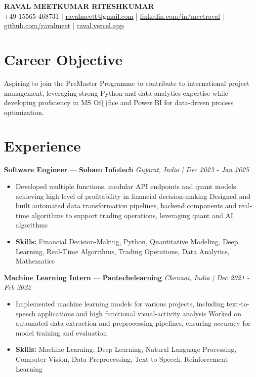 \documentclass[a4paper,10pt]{article}
\begin{document}
\begin{center}
  {\Large\bfseries RAVAL MEETKUMAR RITESHKUMAR}\\[2pt]
  {\small +49 15565 468731 \;|\; \href{mailto:ravalmeett@gmail.com}{ravalmeett@gmail.com} \;|\; \href{https://www.linkedin.com/in/meetraval/}{linkedin.com/in/meetraval} \;|\; \href{https://github.com/ravalmeet}{github.com/ravalmeet} \;|\; \href{https://raval.vercel.app/}{raval.vercel.app}}
\end{center}
\vspace{-3pt}

\section*{Career Objective}
Aspiring to join the PreMaster Programme to contribute to international project management, leveraging strong Python and data analytics expertise while developing proficiency in MS Of\{\}fice and Power BI for data-driven process optimization.\par

\section*{Experience}
\textbf{Software Engineer} — \textbf{Soham Infotech} \hfill \textit{Gujarat, India \;|\; Dec 2023 - Jan 2025}\par
\vspace{1pt}
\begin{itemize}
  \item Developed multiple functions, modular API endpoints and quant models achieving high level of profitability in financial decision-making Designed and built automated data transformation pipelines, backend components and real-time algorithms to support trading operations, leveraging quant and AI algorithms
  \item \textbf{Skills:} Financial Decision-Making, Python, Quantitative Modeling, Deep Learning, Real-Time Algorithms, Trading Operations, Data Analytics, Mathematics
\end{itemize}
\vspace{3pt}
\textbf{Machine Learning Intern} — \textbf{Pantechelearning} \hfill \textit{Chennai, India \;|\; Dec 2021 - Feb 2022}\par
\vspace{1pt}
\begin{itemize}
  \item Implemented machine learning models for various projects, including text-to-speech applications and high functional visual-activity analysis Worked on automated data extraction and preprocessing pipelines, ensuring accuracy for model training and evaluation
  \item \textbf{Skills:} Machine Learning, Deep Learning, Natural Language Processing, Computer Vision, Data Preprocessing, Text-to-Speech, Reinforcement Learning
\end{itemize}
\end{document}
